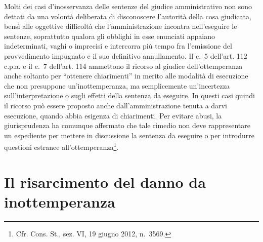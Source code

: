 \documentclass[12pt,it,a4paper,]{report}
\begin{document}
Molti dei casi d'inosservanza delle sentenze del giudice amministrativo
non sono dettati da una volontà deliberata di disconoscere l'autorità
della cosa giudicata, bensì alle oggettive difficoltà che
l'amministrazione incontra nell'eseguire le sentenze, soprattutto
qualora gli obblighi in esse enunciati appaiano indeterminati, vaghi o
imprecisi e intercorra più tempo fra l'emissione del provvedimento
impugnato e il suo definitivo annullamento. Il c.~5 dell'art. 112 c.p.a.
e il c.~7 dell'art. 114 ammettono il ricorso al giudice
dell'ottemperanza anche soltanto per ``ottenere chiarimenti'' in merito
alle modalità di esecuzione che non presuppone un'inottemperanza, ma
semplicemente un'incertezza sull'interpretazione o sugli effetti della
sentenza da eseguire. In questi casi quindi il ricorso può essere
proposto anche dall'amministrazione tenuta a darvi esecuzione, quando
abbia esigenza di chiarimenti. Per evitare abusi, la giurisprudenza ha
comunque affermato che tale rimedio non deve rappresentare un espediente
per mettere in discussione la sentenza da eseguire o per introdurre
questioni estranee all'ottemperanza\footnote{Cfr. Cons. St., sez. VI, 19
  giugno 2012, n.~3569.}.

\hypertarget{il-risarcimento-del-danno-da-inottemperanza}{%
\section{Il risarcimento del danno da
inottemperanza}\label{il-risarcimento-del-danno-da-inottemperanza}}
\end{document}
